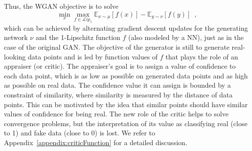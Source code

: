 \documentclass{article} %
\newcommand{\Li}[1]{\mathcal{L}ip_{#1}}
\newcommand{\af}[1]{\textcolor{blue}{#1}}
\begin{document}
Thus, the WGAN objective is to solve 
\begin{equation}\label{eq:WGANGame} \min_\nu \max_{f\in \Li{1}} \mathbb{E}_{x\sim \mu} [f(x)] - \mathbb{E}_{y\sim \nu}[f(y)]\enspace, \end{equation}
which can be achieved by alternating gradient descent updates for the generating network  $\nu$ and the {1-Lipschitz} function $f$ (also modeled by a NN), just as in the case of the original GAN. The objective of the generator is still to generate real-looking data points and is led by function values of $f$ that plays the role of
an appraiser (or critic). The appraiser's goal is to assign a value of confidence to each data point, which is as low as possible on generated data points and as high as possible on real data. The confidence value it can assign is bounded by a constraint of similarity, where similarity is measured by the distance of data points. This can be motivated by the idea that similar points should have similar values of confidence for being real. The new role of the critic helps to solve convergence problems,
 but the interpretation of its value as classifying real (close to 1) and fake data (close to 0) is lost. We refer to Appendix~\ref{appendix:criticFunction} for a detailed discussion.



\end{document}
